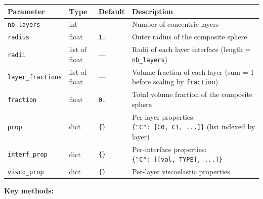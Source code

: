 \documentclass[
  a4paper,
  numbers=noendperiod,
  DIV=12]{scrreprt}
\newcounter{none} %
\begin{document}
{\def\LTcaptype{none} %
\begin{longtable}[]{@{}
  >{\raggedright\arraybackslash}p{}
  >{\raggedright\arraybackslash}p{}
  >{\raggedright\arraybackslash}p{}
  >{\raggedright\arraybackslash}p{}@{}}
\toprule\noalign{}
\begin{minipage}[b]{\linewidth}\raggedright
Parameter
\end{minipage} & \begin{minipage}[b]{\linewidth}\raggedright
Type
\end{minipage} & \begin{minipage}[b]{\linewidth}\raggedright
Default
\end{minipage} & \begin{minipage}[b]{\linewidth}\raggedright
Description
\end{minipage} \\
\midrule\noalign{}
\endhead
\bottomrule\noalign{}
\endlastfoot
\texttt{nb\_layers} & int & --- & Number of concentric layers \\
\texttt{radius} & float & \texttt{1.} & Outer radius of the composite
sphere \\
\texttt{radii} & list of float & --- & Radii of each layer interface
(length = \texttt{nb\_layers}) \\
\texttt{layer\_fractions} & list of float & --- & Volume fraction of
each layer (sum = 1 before scaling by \texttt{fraction}) \\
\texttt{fraction} & float & \texttt{0.} & Total volume fraction of the
composite sphere \\
\texttt{prop} & dict & \texttt{\{\}} & Per-layer properties:
\texttt{\{"C":\ {[}C0,\ C1,\ ...{]}\}} (list indexed by layer) \\
\texttt{interf\_prop} & dict & \texttt{\{\}} & Per-interface properties:
\texttt{\{"C":\ {[}{[}val,\ TYPE{]},\ ...{]}\}} \\
\texttt{visco\_prop} & dict & \texttt{\{\}} & Per-layer viscoelastic
properties \\
\end{longtable}
}

\textbf{Key methods:}
\end{document}
